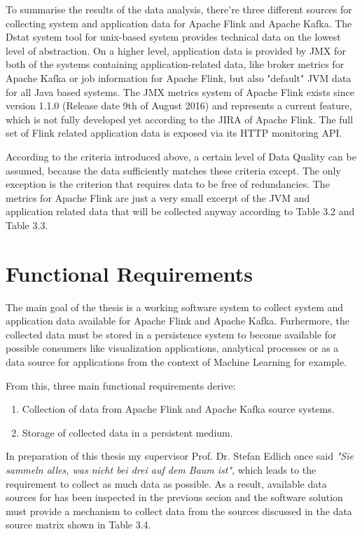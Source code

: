 To summarise the results of the data analysis, there're three different sources for collecting system and application
data for Apache Flink and Apache Kafka. The Dstat system tool for unix-based system provides technical data on the
lowest level of abstraction. On a higher level, application data is provided by JMX for both of the systems containing
application-related data, like broker metrics for Apache Kafka or job information for Apache Flink, but also "default"
JVM data for all Java based systems. The JMX metrics system of Apache Flink exists since version 1.1.0 (Release date
9th of August 2016) and represents a current feature, which is not fully developed yet according to the JIRA of
Apache Flink. The full set of Flink related application data is exposed via its HTTP
monitoring API.

According to the criteria introduced above, a certain level of Data Quality can be assumed, because the data sufficiently
matches these criteria except. The only exception is the criterion that requires data to be free of redundancies. The metrics
for Apache Flink are just a very small excerpt of the JVM and application related data that will be collected anyway according
to Table 3.2 and Table 3.3.

\section{Functional Requirements}

The main goal of the thesis is a working software system to collect system and application data available
for Apache Flink and Apache Kafka. Furhermore, the collected data must be stored in a
persistence system to become available for possible consumers like visualization applications,
analytical processes or as a data source for applications from the context of Machine Learning
for example.

From this, three main functional requirements derive:
\begin{enumerate}
    \item Collection of data from Apache Flink and Apache Kafka source systems.
    \item Storage of collected data in a persistent medium.
\end{enumerate}

In preparation of this thesis my supervisor Prof. Dr. Stefan Edlich once said \textit{"Sie sammeln
alles, was nicht bei drei auf dem Baum ist"}, which leads to the requirement to collect as much data
as possible. As a result, available data sources for has been inspected in the previous secion and the
software solution must provide a mechanism to collect data from the sources discussed in the data source
matrix shown in Table 3.4.

